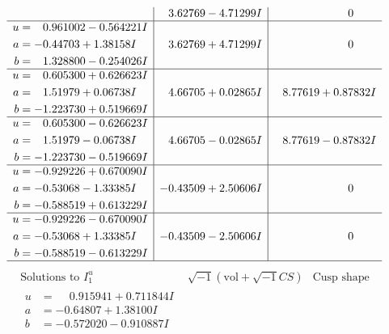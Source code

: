 \documentclass[1p]{elsarticle_modified}
\theoremstyle{definition}
\newcommand{\I}{\sqrt{-1}}
\begin{document}
$$\begin{array}{c|c|c}
 & \phantom{-}3.62769 - 4.71299 I & \phantom{-0.000000 } 0 \\ \hline\begin{aligned}
u &= \phantom{-}0.961002 - 0.564221 I \\
a &= -0.44703 + 1.38158 I \\
b &= \phantom{-}1.328800 - 0.254026 I\end{aligned}
 & \phantom{-}3.62769 + 4.71299 I & \phantom{-0.000000 } 0 \\ \hline\begin{aligned}
u &= \phantom{-}0.605300 + 0.626623 I \\
a &= \phantom{-}1.51979 + 0.06738 I \\
b &= -1.223730 + 0.519669 I\end{aligned}
 & \phantom{-}4.66705 + 0.02865 I & \phantom{-}8.77619 + 0.87832 I \\ \hline\begin{aligned}
u &= \phantom{-}0.605300 - 0.626623 I \\
a &= \phantom{-}1.51979 - 0.06738 I \\
b &= -1.223730 - 0.519669 I\end{aligned}
 & \phantom{-}4.66705 - 0.02865 I & \phantom{-}8.77619 - 0.87832 I \\ \hline\begin{aligned}
u &= -0.929226 + 0.670090 I \\
a &= -0.53068 - 1.33385 I \\
b &= -0.588519 + 0.613229 I\end{aligned}
 & -0.43509 + 2.50606 I & \phantom{-0.000000 } 0 \\ \hline\begin{aligned}
u &= -0.929226 - 0.670090 I \\
a &= -0.53068 + 1.33385 I \\
b &= -0.588519 - 0.613229 I\end{aligned}
 & -0.43509 - 2.50606 I & \phantom{-0.000000 } 0\\
 \hline 
 \end{array}$$\newpage$$\begin{array}{c|c|c}  
\text{Solutions to }I^u_{1}& \I (\text{vol} + \sqrt{-1}CS) & \text{Cusp shape}\\
 \hline 
\begin{aligned}
u &= \phantom{-}0.915941 + 0.711844 I \\
a &= -0.64807 + 1.38100 I \\
b &= -0.572020 - 0.910887 I\end{aligned}

\end{array}$$
\end{document}
